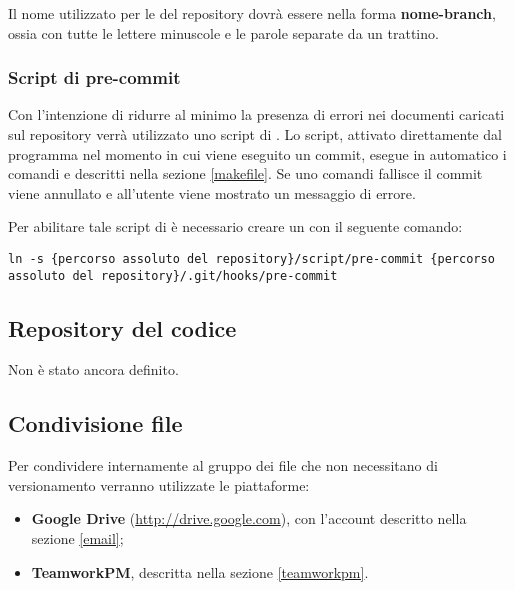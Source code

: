 Il nome utilizzato per le  del repository dovrà essere nella forma \textbf{nome-branch}, ossia con tutte le lettere minuscole e le parole separate da un trattino.

\subsubsection{Script di pre-commit}

Con l'intenzione di ridurre al minimo la presenza di errori nei documenti caricati sul repository verrà utilizzato uno script di . Lo script, attivato direttamente dal programma  nel momento in cui viene eseguito un commit, esegue in automatico i comandi  e  descritti nella sezione \ref{makefile}. Se uno comandi fallisce il commit viene annullato e all'utente viene mostrato un messaggio di errore.

Per abilitare tale script di  è necessario creare un  con il seguente comando:
\begin{lstlisting}
ln -s {percorso assoluto del repository}/script/pre-commit {percorso assoluto del repository}/.git/hooks/pre-commit
\end{lstlisting}

\subsection{Repository del codice}

Non è stato ancora definito.

\subsection{Condivisione file}

Per condividere internamente al gruppo dei file che non necessitano di versionamento verranno utilizzate le piattaforme:
\begin{itemize}
 \item \textbf{Google Drive} (\url{http://drive.google.com}), con l'account descritto nella sezione \ref{email};
 \item \textbf{TeamworkPM}, descritta nella sezione \ref{teamworkpm}.
\end{itemize}
